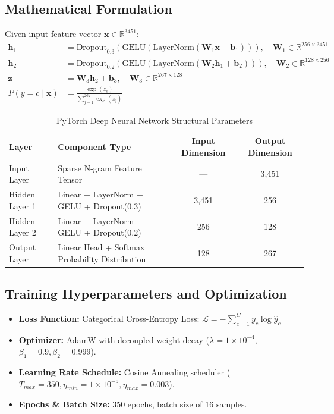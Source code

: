 \documentclass[11pt,a4paper]{article}
\begin{document}
\subsection{Mathematical Formulation}
Given input feature vector $\mathbf{x} \in \mathbb{R}^{3451}$:
\begin{align}
    \mathbf{h}_1 &= \text{Dropout}_{0.3}\left(\text{GELU}\left(\text{LayerNorm}\left(\mathbf{W}_1 \mathbf{x} + \mathbf{b}_1\right)\right)\right), \quad \mathbf{W}_1 \in \mathbb{R}^{256 \times 3451} \\
    \mathbf{h}_2 &= \text{Dropout}_{0.2}\left(\text{GELU}\left(\text{LayerNorm}\left(\mathbf{W}_2 \mathbf{h}_1 + \mathbf{b}_2\right)\right)\right), \quad \mathbf{W}_2 \in \mathbb{R}^{128 \times 256} \\
    \mathbf{z} &= \mathbf{W}_3 \mathbf{h}_2 + \mathbf{b}_3, \quad \mathbf{W}_3 \in \mathbb{R}^{267 \times 128} \\
    P(y = c \mid \mathbf{x}) &= \frac{\exp(z_c)}{\sum_{j=1}^{267} \exp(z_j)}
\end{align}

\begin{table}[h]
\centering
\small
\caption{PyTorch Deep Neural Network Structural Parameters}
\vspace{0.4em}
\begin{tabular}{llcc}
\toprule
\textbf{Layer} & \textbf{Component Type} & \textbf{Input Dimension} & \textbf{Output Dimension} \\
\midrule
Input Layer & Sparse N-gram Feature Tensor & --- & 3,451 \\
Hidden Layer 1 & Linear + LayerNorm + GELU + Dropout(0.3) & 3,451 & 256 \\
Hidden Layer 2 & Linear + LayerNorm + GELU + Dropout(0.2) & 256 & 128 \\
Output Layer & Linear Head + Softmax Probability Distribution & 128 & 267 \\
\bottomrule
\end{tabular}
\end{table}

\subsection{Training Hyperparameters and Optimization}
\begin{itemize}[noitemsep]
    \item \textbf{Loss Function:} Categorical Cross-Entropy Loss: $\mathcal{L} = -\sum_{c=1}^{C} y_c \log \hat{y}_c$
    \item \textbf{Optimizer:} AdamW with decoupled weight decay ($\lambda = 1 \times 10^{-4}$, $\beta_1 = 0.9, \beta_2 = 0.999$).
    \item \textbf{Learning Rate Schedule:} Cosine Annealing scheduler ($T_{max} = 350, \eta_{min} = 1 \times 10^{-5}, \eta_{max} = 0.003$).
    \item \textbf{Epochs \& Batch Size:} 350 epochs, batch size of 16 samples.
\end{itemize}
\end{document}
